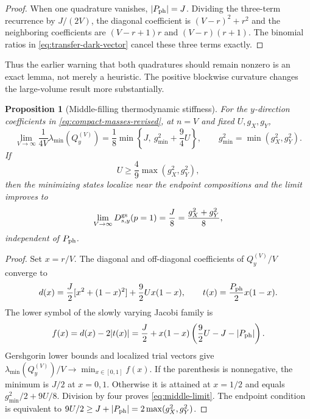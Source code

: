 \documentclass[11pt]{article}
\newtheorem{proposition}[theorem]{Proposition}
\theoremstyle{remark}
\begin{document}
\begin{proof}
When one quadrature vanishes, $|P_{\rm ph}|=J$.  Dividing the three-term recurrence by $J/(2V)$, the diagonal coefficient is $(V-r)^2+r^2$ and the neighboring coefficients are $(V-r+1)r$ and $(V-r)(r+1)$.  The binomial ratios in \eqref{eq:transfer-dark-vector} cancel these three terms exactly.
\end{proof}

Thus the earlier warning that both quadratures should remain nonzero is an exact lemma, not merely a heuristic.  The positive blockwise curvature changes the large-volume result more substantially.

\begin{proposition}[Middle-filling thermodynamic stiffness]
\label{prop:middle-limit}
For the $y$-direction coefficients in \cref{eq:compact-masses-revised}, at $n=V$ and fixed $U,g_X,g_Y$,
\begin{equation}
 \boxed{
 \lim_{V\to\infty}\frac1{4V}\lambda_{\min}(Q_y^{(V)})
 =\frac18\min\left\{J,\ g_{\min}^2+\frac94U\right\},}
 \qquad g_{\min}^2=\min(g_X^2,g_Y^2).
 \label{eq:middle-limit}
\end{equation}
If
\begin{equation}
 U\ge\frac49\max(g_X^2,g_Y^2),
 \label{eq:endpoint-condition}
\end{equation}
then the minimizing states localize near the endpoint compositions and the limit improves to
\begin{equation}
 \lim_{V\to\infty}D_{s,y}^{\rm gs}(p=1)=\frac{J}{8}
 =\frac{g_X^2+g_Y^2}{8},
 \label{eq:J-over-eight}
\end{equation}
independent of $P_{\rm ph}$.
\end{proposition}

\begin{proof}
Set $x=r/V$.  The diagonal and off-diagonal coefficients of $Q_y^{(V)}/V$ converge to
\begin{equation}
 d(x)=\frac J2[x^2+(1-x)^2]+\frac92Ux(1-x),
 \qquad
 t(x)=\frac{P_{\rm ph}}2x(1-x).
\end{equation}
The lower symbol of the slowly varying Jacobi family is
\begin{equation}
 f(x)=d(x)-2|t(x)|
 =\frac J2+x(1-x)\left(\frac92U-J-|P_{\rm ph}|\right).
\end{equation}
Gershgorin lower bounds and localized trial vectors give
$\lambda_{\min}(Q_y^{(V)})/V\to\min_{x\in[0,1]}f(x)$.  If the parenthesis is nonnegative, the minimum is $J/2$ at $x=0,1$.  Otherwise it is attained at $x=1/2$ and equals $g_{\min}^2/2+9U/8$.  Division by four proves \eqref{eq:middle-limit}.  The endpoint condition is equivalent to $9U/2\ge J+|P_{\rm ph}|=2\max(g_X^2,g_Y^2)$.
\end{proof}
\end{document}
